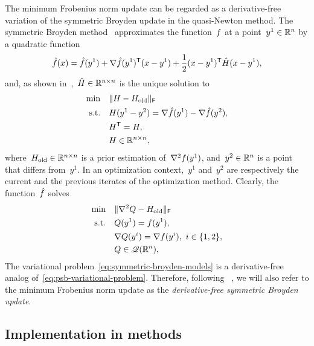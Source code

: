 The minimum Frobenius norm update can be regarded as a derivative-free variation of the symmetric Broyden update in the quasi-Newton method.
The symmetric Broyden method~\cite{Powell_1970b} approximates the function~$f$ at a point~$y^1 \in \mathbb{R}^n$ by a quadratic function
\begin{align*}
    \objm(\iter) = \objm(y^1) + \nabla \objm(y^1)^{\T} (\iter - y^1) + \frac{1}{2} (\iter - y^1)^{\T} \hat{H} (\iter - y^1),
\end{align*}
and, as shown in~\cite[Thm.~4.2]{Dennis_Schnabel_1979},~$\hat{H} \in \mathbb{R}^{n \times n}$ is the unique solution to
\begin{align*}
    \min        & \quad \norm{H - H_{\text{old}}}_{\mathsf{F}}\\
    \text{s.t.} & \quad H (y^1 - y^2) = \nabla \objm(y^1) - \nabla \objm(y^2),\\
                & \quad H^{\T} = H,\\
                & \quad H \in \R^{n \times n},
\end{align*}
where~$H_{\text{old}} \in \mathbb{R}^{n \times n}$ is a prior estimation of~$\nabla^2 f(y^1)$, and~$y^2 \in \mathbb{R}^n$ is a point that differs from~$y^1$.
In an optimization context,~$y^1$ and~$y^2$ are respectively the current and the previous iterates of the optimization method.
Clearly, the function~$\objm$ solves
\begin{subequations}
    \label{eq:psb-variational-problem}
    \begin{align}
        \min        & \quad \lVert\nabla^2 Q - H_{\text{old}}\rVert_{\mathsf{F}}\\
        \text{s.t.} & \quad Q(y^1) = f(y^1),\\
                    & \quad \nabla Q(y^i) = \nabla f(y^i), ~ i \in \{1, 2\},\\
                    & \quad Q \in \mathscr{Q}(\mathbb{R}^n),
    \end{align}
\end{subequations}
The variational problem~\cref{eq:symmetric-broyden-models} is a derivative-free analog of~\cref{eq:psb-variational-problem}.
Therefore, following \citeauthor{Powell_2013}~\cite{Powell_2013}, we will also refer to the minimum Frobenius norm update as the \emph{derivative-free symmetric Broyden update}.

\subsection{Implementation in  methods}

